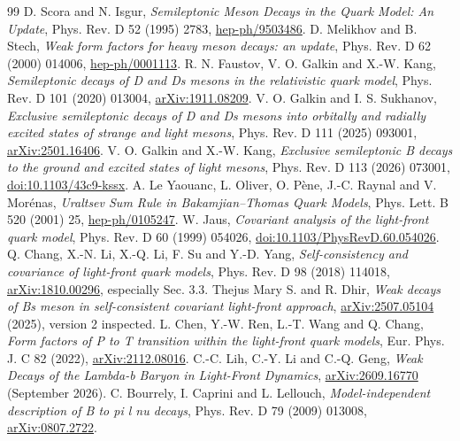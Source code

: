 \documentclass[11pt,a4paper]{article}
\begin{document}
\begin{thebibliography}{99}
 D. Scora and N. Isgur, \emph{Semileptonic Meson Decays in the Quark Model: An Update}, Phys. Rev. D 52 (1995) 2783, \href{https://arxiv.org/abs/hep-ph/9503486}{hep-ph/9503486}.
 D. Melikhov and B. Stech, \emph{Weak form factors for heavy meson decays: an update}, Phys. Rev. D 62 (2000) 014006, \href{https://arxiv.org/abs/hep-ph/0001113}{hep-ph/0001113}.
 R. N. Faustov, V. O. Galkin and X.-W. Kang, \emph{Semileptonic decays of D and Ds mesons in the relativistic quark model}, Phys. Rev. D 101 (2020) 013004, \href{https://arxiv.org/abs/1911.08209}{arXiv:1911.08209}.
 V. O. Galkin and I. S. Sukhanov, \emph{Exclusive semileptonic decays of D and Ds mesons into orbitally and radially excited states of strange and light mesons}, Phys. Rev. D 111 (2025) 093001, \href{https://arxiv.org/abs/2501.16406}{arXiv:2501.16406}.
 V. O. Galkin and X.-W. Kang, \emph{Exclusive semileptonic B decays to the ground and excited states of light mesons}, Phys. Rev. D 113 (2026) 073001, \href{https://doi.org/10.1103/43c9-kssx}{doi:10.1103/43c9-kssx}.
 A. Le Yaouanc, L. Oliver, O. P\`ene, J.-C. Raynal and V. Mor\'enas, \emph{Uraltsev Sum Rule in Bakamjian--Thomas Quark Models}, Phys. Lett. B 520 (2001) 25, \href{https://arxiv.org/abs/hep-ph/0105247}{hep-ph/0105247}.
 W. Jaus, \emph{Covariant analysis of the light-front quark model}, Phys. Rev. D 60 (1999) 054026, \href{https://doi.org/10.1103/PhysRevD.60.054026}{doi:10.1103/PhysRevD.60.054026}.
 Q. Chang, X.-N. Li, X.-Q. Li, F. Su and Y.-D. Yang, \emph{Self-consistency and covariance of light-front quark models}, Phys. Rev. D 98 (2018) 114018, \href{https://arxiv.org/abs/1810.00296}{arXiv:1810.00296}, especially Sec. 3.3.
 Thejus Mary S. and R. Dhir, \emph{Weak decays of Bs meson in self-consistent covariant light-front approach}, \href{https://arxiv.org/abs/2507.05104}{arXiv:2507.05104} (2025), version 2 inspected.
 L. Chen, Y.-W. Ren, L.-T. Wang and Q. Chang, \emph{Form factors of P to T transition within the light-front quark models}, Eur. Phys. J. C 82 (2022), \href{https://arxiv.org/abs/2112.08016}{arXiv:2112.08016}.
 C.-C. Lih, C.-Y. Li and C.-Q. Geng, \emph{Weak Decays of the Lambda-b Baryon in Light-Front Dynamics}, \href{https://arxiv.org/abs/2609.16770}{arXiv:2609.16770} (September 2026).
 C. Bourrely, I. Caprini and L. Lellouch, \emph{Model-independent description of B to pi l nu decays}, Phys. Rev. D 79 (2009) 013008, \href{https://arxiv.org/abs/0807.2722}{arXiv:0807.2722}.

\end{thebibliography}
\end{document}
